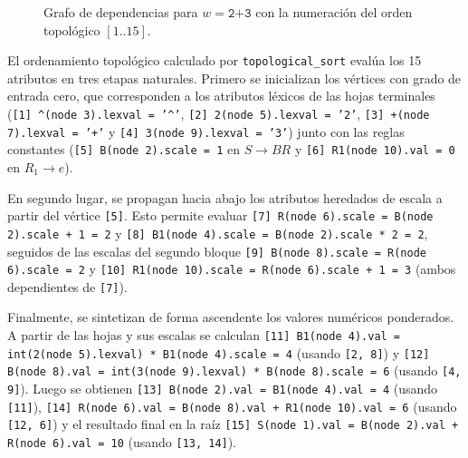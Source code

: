 \documentclass[11pt,a4paper]{article}
\begin{document}
\begin{figure}[htbp]
{%
}
\caption{Grafo de dependencias para $w = \texttt{\^{}2+3}$ con la numeraci\'on del orden topol\'ogico $[1..15]$.}
\label{fig:dep_graph}
\end{figure}

El ordenamiento topol\'ogico calculado por \texttt{topological\_sort} eval\'ua los 15 atributos en tres etapas naturales. Primero se inicializan los v\'ertices con grado de entrada cero, que corresponden a los atributos l\'exicos de las hojas terminales (\texttt{[1] \^{}(node 3).lexval = '\^{}'}, \texttt{[2] 2(node 5).lexval = '2'}, \texttt{[3] +(node 7).lexval = '+'} y \texttt{[4] 3(node 9).lexval = '3'}) junto con las reglas constantes (\texttt{[5] B(node 2).scale = 1} en $S \to BR$ y \texttt{[6] R1(node 10).val = 0} en $R_1 \to e$).

En segundo lugar, se propagan hacia abajo los atributos heredados de escala a partir del v\'ertice \texttt{[5]}. Esto permite evaluar \texttt{[7] R(node 6).scale = B(node 2).scale + 1 = 2} y \texttt{[8] B1(node 4).scale = B(node 2).scale * 2 = 2}, seguidos de las escalas del segundo bloque \texttt{[9] B(node 8).scale = R(node 6).scale = 2} y \texttt{[10] R1(node 10).scale = R(node 6).scale + 1 = 3} (ambos dependientes de \texttt{[7]}).

Finalmente, se sintetizan de forma ascendente los valores num\'ericos ponderados. A partir de las hojas y sus escalas se calculan \texttt{[11] B1(node 4).val = int(2(node 5).lexval) * B1(node 4).scale = 4} (usando \texttt{[2, 8]}) y \texttt{[12] B(node 8).val = int(3(node 9).lexval) * B(node 8).scale = 6} (usando \texttt{[4, 9]}). Luego se obtienen \texttt{[13] B(node 2).val = B1(node 4).val = 4} (usando \texttt{[11]}), \texttt{[14] R(node 6).val = B(node 8).val + R1(node 10).val = 6} (usando \texttt{[12, 6]}) y el resultado final en la ra\'iz \texttt{[15] S(node 1).val = B(node 2).val + R(node 6).val = 10} (usando \texttt{[13, 14]}).
\end{document}

